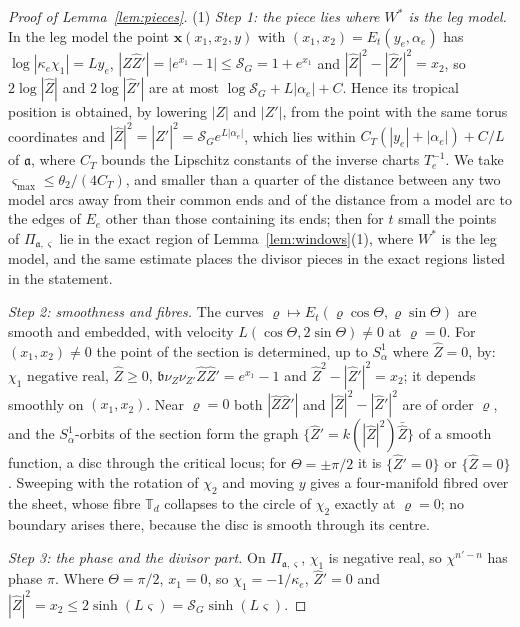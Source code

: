 \begin{proof}[Proof of Lemma~\ref{lem:pieces}]
(1) \emph{Step 1: the piece lies where $W^*$ is the leg model.} In the leg model the point $\mathbf x(x_1,x_2,y)$ with
$(x_1,x_2)=E_t(y_e,\alpha_e)$ has $\log|\kappa_e\chi_1|=Ly_e$, $|\hat Z\hat Z'|=|e^{x_1}-1|\le\mathcal S_G=1+e^{x_1}$ and
$|\hat Z|^2-|\hat Z'|^2=x_2$, so $2\log|\hat Z|$ and $2\log|\hat Z'|$ are at most $\log\mathcal S_G+L|\alpha_e|+C$. Hence its
tropical position is obtained, by lowering $|Z|$ and $|Z'|$, from the point with the same torus coordinates and $|\hat
Z|^2=|\hat Z'|^2=\mathcal S_Ge^{L|\alpha_e|}$, which lies within $C_T(|y_e|+|\alpha_e|)+C/L$ of $\mathfrak a$, where $C_T$
bounds the Lipschitz constants of the inverse charts $T_e^{-1}$. We take $\varsigma_{\max}\le\theta_2/(4C_T)$, and smaller
than a quarter of the distance between any two model arcs away from their common ends and of the distance from a model
arc to the edges of $E_e$ other than those containing its ends; then for $t$ small the points of
$\Pi_{\mathfrak a,\varsigma}$ lie in the exact region of Lemma~\ref{lem:windows}(1), where $W^*$ is the leg model, and the
same estimate places the divisor pieces in the exact regions listed in the statement.

\emph{Step 2: smoothness and fibres.} The curves $\varrho\mapsto E_t(\varrho\cos\Theta,\varrho\sin\Theta)$ are smooth and
embedded, with velocity $L(\cos\Theta,2\sin\Theta)\neq0$ at $\varrho=0$. For $(x_1,x_2)\ne0$ the point of the section is
determined, up to $S^1_\alpha$ where $\hat Z=0$, by: $\chi_1$ negative real, $\hat Z\ge0$, $\mathfrak b\nu_Z\nu_{Z'}\hat
Z\hat Z'=e^{x_1}-1$ and $\hat Z^2-|\hat Z'|^2=x_2$; it depends smoothly on $(x_1,x_2)$. Near $\varrho=0$ both $|\hat Z\hat
Z'|$ and $|\hat Z|^2-|\hat Z'|^2$ are of order $\varrho$, and the $S^1_\alpha$-orbits of the section form the graph
$\{\hat Z'=k(|\hat Z|^2)\bar{\hat Z}\}$ of a smooth function, a disc through the critical locus; for $\Theta=\pm\pi/2$ it is
$\{\hat Z'=0\}$ or $\{\hat Z=0\}$. Sweeping with the rotation of $\chi_2$ and moving $y$ gives a four-manifold fibred over
the sheet, whose fibre $\mathbb T_d$ collapses to the circle of $\chi_2$ exactly at $\varrho=0$; no boundary arises there,
because the disc is smooth through its centre.

\emph{Step 3: the phase and the divisor part.} On $\Pi_{\mathfrak a,\varsigma}$, $\chi_1$ is negative real, so
$\chi^{n'-n}$ has phase $\pi$. Where $\Theta=\pi/2$, $x_1=0$, so $\chi_1=-1/\kappa_e$, $\hat Z'=0$ and $|\hat Z|^2=x_2\le
2\sinh(L\varsigma)=\mathcal S_G\sinh(L\varsigma)$.


\end{proof}
